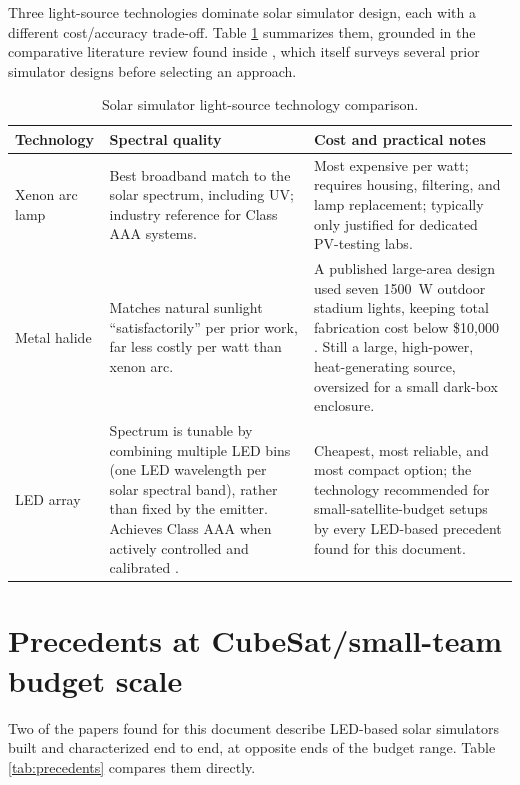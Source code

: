 Three light-source technologies dominate solar simulator design, each with a different cost/accuracy trade-off. Table \ref{tab:tech-comparison} summarizes them, grounded in the comparative literature review found inside \cite{rezende2024lowcost}, which itself surveys several prior simulator designs before selecting an approach.

\begin{table}[!ht]
\centering
\small
\caption{Solar simulator light-source technology comparison.}
\label{tab:tech-comparison}
\begin{tabularx}{\textwidth}{p{} X X}
\toprule
\textbf{Technology} & \textbf{Spectral quality} & \textbf{Cost and practical notes} \\
\midrule
Xenon arc lamp & Best broadband match to the solar spectrum, including UV; industry reference for Class AAA systems. & Most expensive per watt; requires housing, filtering, and lamp replacement; typically only justified for dedicated PV-testing labs. \\
Metal halide & Matches natural sunlight ``satisfactorily'' per prior work, far less costly per watt than xenon arc. & A published large-area design used seven 1500~W outdoor stadium lights, keeping total fabrication cost below \$10{,}000 \cite{rezende2024lowcost}. Still a large, high-power, heat-generating source, oversized for a small dark-box enclosure. \\
LED array & Spectrum is tunable by combining multiple LED bins (one LED wavelength per solar spectral band), rather than fixed by the emitter. Achieves Class AAA when actively controlled and calibrated \cite{schulthess2026classaaa}. & Cheapest, most reliable, and most compact option; the technology recommended for small-satellite-budget setups by every LED-based precedent found for this document. \\
\bottomrule
\end{tabularx}
\end{table}

\section{Precedents at CubeSat/small-team budget scale}

Two of the papers found for this document describe LED-based solar simulators built and characterized end to end, at opposite ends of the budget range. Table \ref{tab:precedents} compares them directly.

